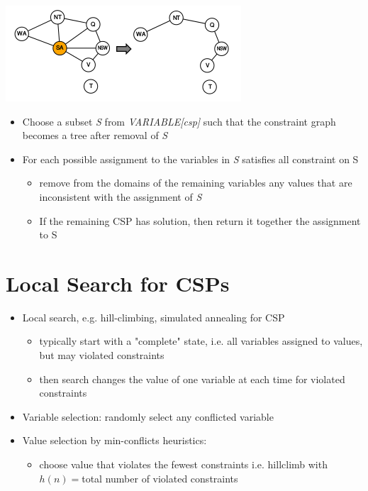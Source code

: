 \includegraphics[scale=1]{chap1_pics/treestructuremap.png} 
\label{treestructuremap}

\begin{itemize}
\item Choose a subset \textit{S} from \textit{VARIABLE[csp]} such that the constraint graph becomes a tree after removal of \textit{S}
\item For each possible assignment to the variables in \textit{S} satisfies all constraint on S 
\begin{itemize}
\item remove from the domains of the remaining variables any values that are inconsistent with the assignment of \textit{S}
\item If the remaining CSP has solution, then return it together the assignment to S
\end{itemize}
\end{itemize}

\section{Local Search for CSPs}
\begin{itemize}
\item Local search, e.g. hill-climbing, simulated annealing for CSP
\begin{itemize}
\item typically start with a "complete" state, i.e. all variables assigned to values, but may violated constraints
\item then search changes the value of one variable at each time for violated constraints
\end{itemize}
\item Variable selection: randomly select any conflicted variable
\item Value selection by min-conflicts heuristics:
\begin{itemize}
\item choose value that violates the fewest constraints i.e. hillclimb with $h(n) = $total number of violated constraints
\end{itemize}
\end{itemize}

